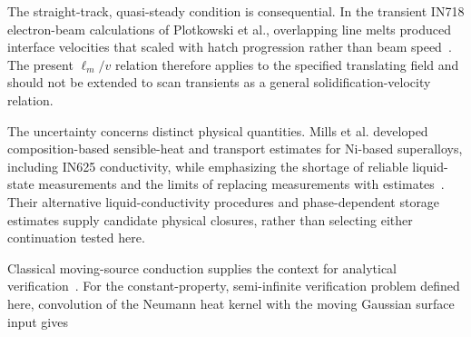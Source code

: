 The straight-track, quasi-steady condition is consequential. In the transient IN718 electron-beam calculations of Plotkowski et al., overlapping line melts produced interface velocities that scaled with hatch progression rather than beam speed~\cite{Plotkowski2017Rapid}. The present $\ell_m/v$ relation therefore applies to the specified translating field and should not be extended to scan transients as a general solidification-velocity relation.

The uncertainty concerns distinct physical quantities. Mills et al. developed composition-based sensible-heat and transport estimates for Ni-based superalloys, including IN625 conductivity, while emphasizing the shortage of reliable liquid-state measurements and the limits of replacing measurements with estimates~\cite{mills2006}. Their alternative liquid-conductivity procedures and phase-dependent storage estimates supply candidate physical closures, rather than selecting either continuation tested here.


Classical moving-source conduction supplies the context for analytical verification~\cite{vanelsen2007}. For the constant-property, semi-infinite verification problem defined here, convolution of the Neumann heat kernel with the moving Gaussian surface input gives
